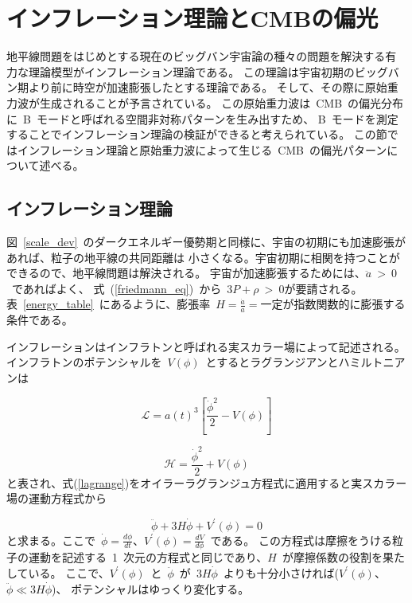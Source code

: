 

\section{インフレーション理論とCMBの偏光}

地平線問題をはじめとする現在のビッグバン宇宙論の種々の問題を解決する有力な理論模型がインフレーション理論である\cite{sato}。
この理論は宇宙初期のビッグバン期より前に時空が加速膨張したとする理論である。
そして、その際に原始重力波が生成されることが予言されている\cite{gwave}。
この原始重力波は~CMB~の偏光分布に~B~モードと呼ばれる空間非対称パターンを生み出すため、
B~モードを測定することでインフレーション理論の検証ができると考えられている\cite{gwave}。
この節ではインフレーション理論と原始重力波によって生じる~CMB~の偏光パターンについて述べる。

\subsection{インフレーション理論}
図~\ref{scale_dev}~のダークエネルギー優勢期と同様に、宇宙の初期にも加速膨張があれば、粒子の地平線の共同距離は
小さくなる。宇宙初期に相関を持つことができるので、地平線問題は解決される。
宇宙が加速膨張するためには、$\ddot{a}~>~0$~であればよく、
式~(\ref{friedmann_eq})~から~$3P+\rho~>~0$が要請される。
表~\ref{energy_table}~にあるように、膨張率~$H=\frac{\dot{a}}{a} = $一定が指数関数的に膨張する条件である。

インフレーションはインフラトンと呼ばれる実スカラー場によって記述される。
インフラトンのポテンシャルを~$V(\phi)$~とするとラグランジアンとハミルトニアンは

\begin{equation}
  \mathcal{L} = a(t)^3\left[\frac{\dot{\phi}^2}{2} -V(\phi)\right]
  \label{lagrange}
\end{equation}

\begin{equation}
  \mathcal{H} = \frac{\dot{\phi}^2}{2} + V(\phi)
  \label{hamilton}
\end{equation}
と表され、式(\ref{lagrange})をオイラーラグランジュ方程式に適用すると実スカラー場の運動方程式から

\begin{equation}
  \ddot{\phi} + 3H\dot{\phi} + V^\prime(\phi) = 0
  \label{phi_eq}
\end{equation}
と求まる。ここで~$\dot{\phi} = \frac{d\phi}{dt}$、$V^\prime(\phi) = \frac{dV}{d\phi}$~である。
この方程式は摩擦をうける粒子の運動を記述する~1~次元の方程式と同じであり、$H$~が摩擦係数の役割を果たしている。
ここで、$V^{\prime}(\phi)$~と~$\ddot{\phi}$~が~$3 H \dot{\phi}$~よりも十分小さければ($V^{\prime}(\phi)$、$\ddot{\phi} \ll 3H\dot{\phi}$)、
ポテンシャルはゆっくり変化する。

